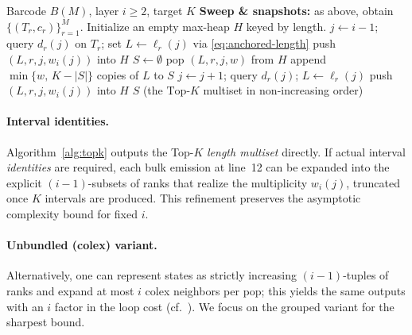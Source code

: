 \documentclass[runningheads]{llncs}
\newcommand{\B}{B}
\newcommand{\Lam}{\Lambda}
\newcommand{\bars}{\B(M)}
\newcommand{\TopK}{\mathrm{Top}\text{-}K}
\begin{document}
\begin{algorithm}[!h]
\caption{\textsc{TopK}--$\Lam^i$ (grouped best-first; fixed $i\ge 2$)}\label{alg:topk}
\begin{algorithmic}[1]
\REQUIRE Barcode $\bars$, layer $i\ge 2$, target $K$
\STATE \textbf{Sweep \& snapshots:} as above, obtain $\{(T_r,c_r)\}_{r=1}^M$.
\STATE Initialize an empty max-heap $H$ keyed by length.
  \STATE $j\gets i{-}1$; query $d_r(j)$ on $T_r$; set $L\gets \ell_r(j)$ via \eqref{eq:anchored-length}
   \STATE push $(L,r,j,w_i(j))$ into $H$ \ENDIF
\ENDFOR
\STATE $S\gets\emptyset$ 
  \STATE pop $(L,r,j,w)$ from $H$
  \STATE append $\min\{w,\,K-|S|\}$ copies of $L$ to $S$
    \STATE $j\gets j{+}1$; query $d_r(j)$; $L\gets \ell_r(j)$
     \STATE push $(L,r,j,w_i(j))$ into $H$ \ENDIF
  \ENDIF
\ENDWHILE
\RETURN $S$ (the $\TopK$ multiset in non-increasing order)
\end{algorithmic}
\end{algorithm}

\paragraph{Interval identities.} Algorithm~\ref{alg:topk} outputs the Top-$K$ 
\emph{length multiset} directly. 
If actual interval \emph{identities} are required, each bulk emission 
at line~12 can be expanded into the explicit $(i{-}1)$-subsets of 
ranks that realize the multiplicity $w_i(j)$, truncated once $K$ intervals 
are produced. This refinement preserves the asymptotic complexity bound 
for fixed $i$.

\paragraph{Unbundled (colex) variant.}
Alternatively, one can represent states as strictly increasing $(i{-}1)$-tuples of ranks and expand at most $i$ colex neighbors per pop; this yields the same outputs with an $i$ factor in the loop cost (cf.\ \cite{FredericksonJohnson84,Fagin03}). We focus on the grouped variant for the sharpest bound.




\end{document}

